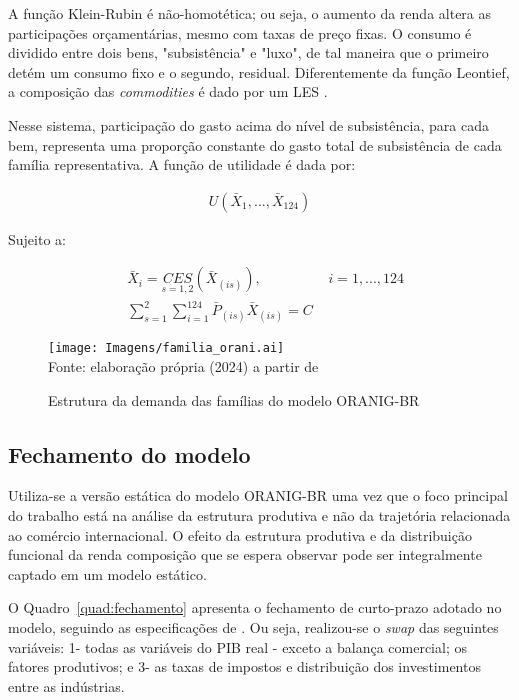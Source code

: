 A função Klein-Rubin é não-homotética; ou seja, o aumento da renda altera as participações orçamentárias, mesmo com taxas de preço fixas. O consumo é dividido entre dois bens, "subsistência" e "luxo", de tal maneira que o primeiro detém um consumo fixo e o segundo, residual. Diferentemente da função Leontief, a composição das \textit{commodities} é dado por um LES \cite{horridge03}.

Nesse sistema, participação do gasto acima do nível de subsistência, para cada bem, representa uma proporção constante do gasto total de subsistência de cada família representativa. A função de utilidade é dada por:

\begin{align*}
	U(\bar{X}_1, ... , \bar{X}_{124})
\end{align*}

Sujeito a:

\begin{align}
	&\bar{X}_i = \underset{s = 1, 2}{CES} (\bar{X}_{(is)}), \hspace{2cm} i = 1, ... , 124 \\
	&\sum_{s = 1}^{2} \sum_{i = 1}^{124} \bar{P}_{(is)} \bar{X}_{(is)} = C
\end{align}

\begin{landscape}
	\begin{figure}
		\centering
		\caption{Estrutura da demanda das famílias do modelo ORANIG-BR} \label{fig:estrutura_familia}
		\texttt{[image: Imagens/familia\_orani.ai]}
		\footnotesize \\
		Fonte: elaboração própria (2024) a partir de \textcite{horridge03}
	\end{figure}
\end{landscape}

\subsection{Fechamento do modelo} \label{subsec:fechamento}

Utiliza-se a versão estática do modelo ORANIG-BR uma vez que o foco principal do trabalho está na análise da estrutura produtiva e não da trajetória relacionada ao comércio internacional. O efeito da estrutura produtiva e da distribuição funcional da renda composição que se espera observar pode ser integralmente captado em um modelo estático.

O Quadro~\ref{quad:fechamento} apresenta o fechamento de curto-prazo adotado no modelo, seguindo as especificações de \textcite{horridge03}. Ou seja, realizou-se o \textit{swap} das seguintes variáveis: 1- todas as variáveis do PIB real - exceto a balança comercial; os fatores produtivos; e 3- as taxas de impostos e distribuição dos investimentos entre as indústrias.

